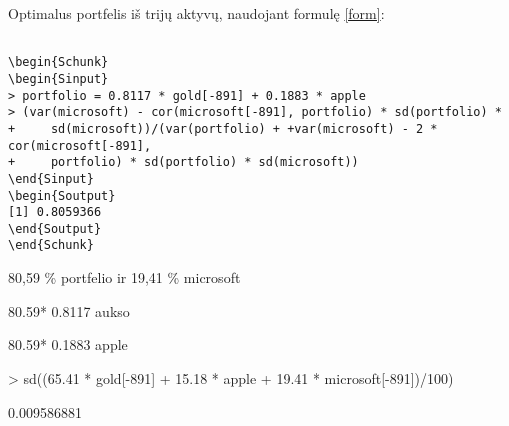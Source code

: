 \documentclass[12pt, a14paper, lithuanian]{article}
\begin{document}
\begin{comment}

 Apytikslės koeficientų reikšmės portfelyje iš dviejų įmonių:



\begin{figure}[H]
  \centering
  \begin{verbatim}
\texttt{[image: kursinis-028]}
\end{verbatim}
  \caption{...}
  
\end{figure}

(gal nereikia)
Iliustracija: pagal grafikus rinktis ta skaiciu, ties kuriuo standartinis nuokrypis maziausias, ji istatyti vietoje i.

\textit{optimaliausias portfelis} = $imone1 \times i \times 0.1 + imone2 \times (1 - i\times 0.1)$ \\


$0.1 \times (i-1) \times Auksas + (1-0.1 \times (i-1)) \times Microsoft$

$0.1 \times (i-1) \times Apple + (1-0.1 \times (i-1)) \times Microsoft$

$0.1 \times (i-1) \times Apple + (1-0.1\times (i-1)) \times Auksas$

\end{comment}

Optimalus portfelis iš trijų aktyvų, naudojant formulę \eqref{form}:

\begin{verbatim}

\begin{Schunk}
\begin{Sinput}
> portfolio = 0.8117 * gold[-891] + 0.1883 * apple
> (var(microsoft) - cor(microsoft[-891], portfolio) * sd(portfolio) * 
+     sd(microsoft))/(var(portfolio) + +var(microsoft) - 2 * cor(microsoft[-891], 
+     portfolio) * sd(portfolio) * sd(microsoft))
\end{Sinput}
\begin{Soutput}
[1] 0.8059366
\end{Soutput}
\end{Schunk}

\end{verbatim}

80,59 \% portfelio ir 19,41 \% microsoft

80.59* 0.8117 aukso

80.59* 0.1883 apple
\begin{Schunk}
\begin{Sinput}
> sd((65.41 * gold[-891] + 15.18 * apple + 19.41 * microsoft[-891])/100)
\end{Sinput}
\begin{Soutput}
[1] 0.009586881
\end{Soutput}
\end{Schunk}
\end{document}
